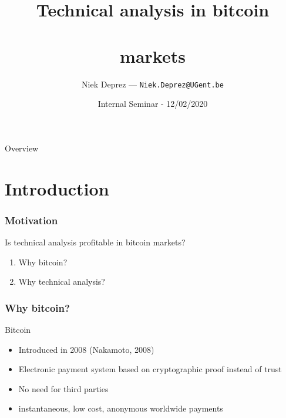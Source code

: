 \documentclass[aspectratio=169]{beamer}
\title{Technical analysis in bitcoin \\ \\ markets}
\date[ISBT 2018]{Internal Seminar - 12/02/2020}
\author[DB]{Niek Deprez --- \texttt{Niek.Deprez@UGent.be}}
\begin{document}


\begin{frame}{Overview}
    \tableofcontents[hideallsubsections]
\end{frame}

\section{Introduction}

\begin{frame}
\frametitle{Motivation}
\begin{alertblock}{Is technical analysis profitable in bitcoin markets?}
	\begin{enumerate} 
		\item Why bitcoin?
		\item Why technical analysis?
	\end{enumerate}
\end{alertblock}
\end{frame}

\begin{frame}

\frametitle{Why bitcoin?}
\begin{block}{Bitcoin}
	\begin{itemize}
		\item Introduced in 2008 (Nakamoto, 2008)
		\item Electronic payment system based on cryptographic proof instead of trust
		\item No need for third parties
		\item instantaneous, low cost, anonymous worldwide payments
	\end{itemize}
\end{block}
\end{frame}
\end{document}
